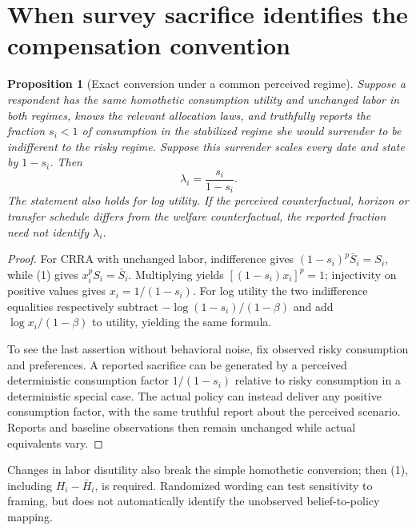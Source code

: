 \documentclass[11pt]{article}
\newtheorem{proposition}[theorem]{Proposition}
\theoremstyle{remark}
\begin{document}
\section{When survey sacrifice identifies the compensation convention}
\begin{proposition}[Exact conversion under a common perceived regime]
Suppose a respondent has the same homothetic consumption utility and
unchanged labor in both regimes, knows the relevant allocation laws, and
truthfully reports the fraction $s_i<1$ of consumption in the stabilized
regime she would surrender to be indifferent to the risky regime. Suppose
this surrender scales every date and state by $1-s_i$. Then
\[
 \lambda_i=\frac{s_i}{1-s_i}.                                    \tag{4}
\]
The statement also holds for log utility. If the perceived counterfactual,
horizon or transfer schedule differs from the welfare counterfactual,
the reported fraction need not identify $\lambda_i$.
\end{proposition}
\begin{proof}
For CRRA with unchanged labor, indifference gives
$(1-s_i)^p\bar S_i=S_i$, while (1) gives
$x_i^pS_i=\bar S_i$. Multiplying yields
$[(1-s_i)x_i]^p=1$; injectivity on positive values gives
$x_i=1/(1-s_i)$. For log utility the two indifference equalities
respectively subtract $-\log(1-s_i)/(1-\beta)$ and add
$\log x_i/(1-\beta)$ to utility, yielding the same formula.

To see the last assertion without behavioral noise, fix observed risky
consumption and preferences. A reported sacrifice can be generated by a
perceived deterministic consumption factor $1/(1-s_i)$ relative to
risky consumption in a deterministic special case. The actual policy can
instead deliver any positive consumption factor, with the same truthful
report about the perceived scenario. Reports and baseline observations
then remain unchanged while actual equivalents vary.
\end{proof}
Changes in labor disutility also break the simple homothetic conversion;
then (1), including $H_i-\bar H_i$, is required. Randomized wording can
test sensitivity to framing, but does not automatically identify the
unobserved belief-to-policy mapping.
\end{document}
